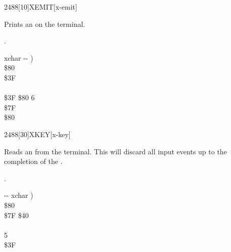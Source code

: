 \vspace*{-2ex}
\begin{worddef}{2488}[10]{XEMIT}[x-emit]%
\item {}

	Prints an  on the terminal.

\see {}.

	\begin{implement} %
	\word{:}   xchar -{}- ) \\
	\tab {} \$80        \\
	  \$3F \\
	\tab {}    \\
	\tab[2]    \$3F  \$80   6   \\
	\tab {} \$7F    \\
	\tab {}  \$80      \\
	\word{;}
	\end{implement}
\end{worddef}


\vspace*{-2ex}
\enlargethispage{6ex}
\begin{worddef}{2488}[30]{XKEY}[x-key]%
\item {}

	Reads an  from the terminal.  This will discard all input
	events up to the completion of the .

\see {}.

	\begin{implement} %
	\word{:}   -{}- xchar ) \\
	\tab {}  \$80       \\
	\tab \$7F  \$40  \\
	\tab {}       \\
	   5     \\
	\tab[2] \$3F    \\
	\tab {}   \word{;}
	\end{implement}
\end{worddef}


